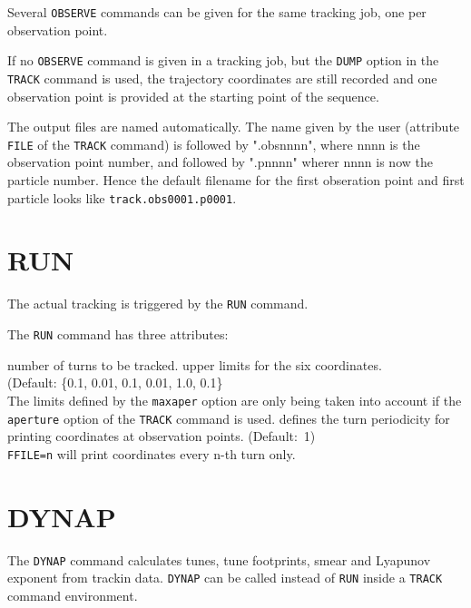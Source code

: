 Several \texttt{OBSERVE} commands can be given for the same tracking
job, one per observation point. 

If no \texttt{OBSERVE} command is given in a tracking job, but the
\texttt{DUMP} option in the \texttt{TRACK} command is used, the
trajectory coordinates are still recorded and one observation point is
provided at the starting point of the sequence. 
     
The output files are named automatically. The name given by
the user (attribute \texttt{FILE} of the \texttt{TRACK} command) is
followed by ".obsnnnn", where nnnn is the observation point number, and followed by 
".pnnnn"  wherer nnnn is now the particle number. Hence the default
filename for the first obseration point and first particle looks like
\texttt{track.obs0001.p0001}.


\section{RUN}
\label{sec:run}

The actual tracking is triggered by the \texttt{RUN} command. 


The \texttt{RUN} command has three attributes:  
     
\begin{madlist}
   number of turns to be tracked.
   upper limits for the six coordinates.\\
  (Default: \{0.1, 0.01, 0.1, 0.01, 1.0, 0.1\} \\
  The limits defined by the \texttt{maxaper} option are only being taken
  into account if the \texttt{aperture} option of the \texttt{TRACK}
  command is used. 
   defines the turn periodicity for printing coordinates at
   observation points. (Default:~1)\\
   \texttt{FFILE=n} will print coordinates every n-th turn only. 
\end{madlist}



\section{DYNAP}

The \texttt{DYNAP} command calculates tunes, tune footprints, smear and
Lyapunov exponent from trackin data. \texttt{DYNAP} can be called
instead of \texttt{RUN} inside a \texttt{TRACK} command environment.

